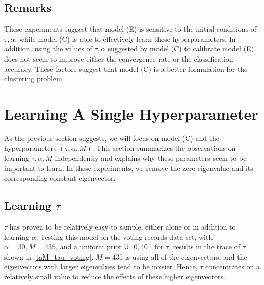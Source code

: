 \documentclass{siamart1116}
\begin{document}
    \subsection{Remarks}
        These experiments suggest that model (E) is sensitive to the initial conditions of $\tau, \alpha$, while model (C) is able to effectively learn these hyperparameters. In addition, using the values of $\tau, \alpha$ suggested by model (C) to calibrate model (E) does not seem to improve either the convergence rate or the classification accuracy. These factors suggest that model (C) is a better formulation for the clustering problem.

\section{Learning A Single Hyperparameter}
    As the previous section suggests, we will focus on model (C) and the hyperparameters $(\tau,\alpha, M)$. This section summarizes the observations on learning $\tau, \alpha, M$ independently and explains why these parameters seem to be important to learn. In these experiments, we remove the zero eigenvalue and its corresponding constant eigenvector.




    \subsection{Learning $\tau$}
        $\tau$ has proven to be relatively easy to sample, either alone or in addition to learning $\alpha$. Testing this model on the voting records data set, with $\alpha = 30, M=435$, and a uniform prior $\mathsf{U}[0, 40]$ for $\tau$, results in the trace of $\tau$ shown in \cref{taM_tau_voting}. $M=435$ is using all of the eigenvectors, and the eigenvectors with larger eigenvalues tend to be noisier. Hence, $\tau$ concentrates on a relatively small value to reduce the effects of these higher eigenvectors.
\end{document}
